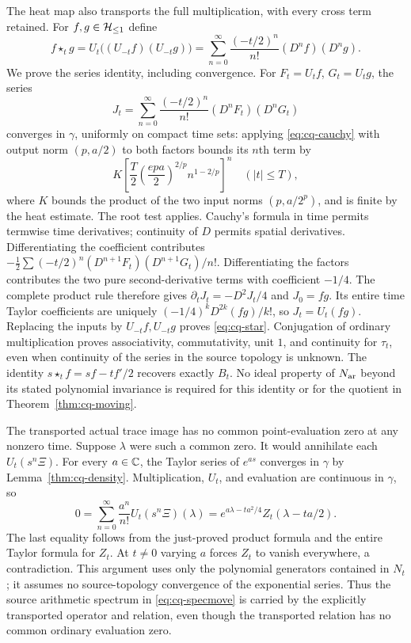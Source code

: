 The heat map also transports the full multiplication, with every
cross term retained. For $f,g\in\mathcal H_{\leq 1}$ define
\begin{equation}\label{eq:cq-star}
 f\star_t g=U_t\bigl((U_{-t}f)(U_{-t}g)\bigr)
    =\sum_{n=0}^\infty\frac{(-t/2)^n}{n!}(D^nf)(D^ng).
\end{equation}
We prove the series identity, including convergence. For
$F_t=U_tf$, $G_t=U_tg$, the series
\[
 J_t=\sum_{n=0}^\infty\frac{(-t/2)^n}{n!}
                    (D^nF_t)(D^nG_t)
\]
converges in $\gamma$, uniformly on compact time sets: applying
\eqref{eq:cq-cauchy} with output norm $(p,a/2)$ to both factors
bounds its $n$th term by
\[
 K\left[\frac T2\left(\frac{epa}{2}\right)^{2/p}
                   n^{1-2/p}\right]^n\quad(|t|\leq T),
\]
where $K$ bounds the product of the two input norms
$(p,a/2^p)$, and is finite by the heat estimate. The root test
applies. Cauchy's formula in time permits termwise time derivatives;
continuity of $D$ permits spatial derivatives. Differentiating the
coefficient contributes
$-\tfrac12\sum(-t/2)^n(D^{n+1}F_t)(D^{n+1}G_t)/n!$.
Differentiating the factors contributes the two pure second-derivative
terms with coefficient $-1/4$. The complete product rule therefore
gives $\partial_tJ_t=-D^2J_t/4$ and $J_0=fg$.
Its entire time Taylor coefficients are uniquely
$(-1/4)^kD^{2k}(fg)/k!$, so $J_t=U_t(fg)$.
Replacing the inputs by $U_{-t}f,U_{-t}g$ proves
\eqref{eq:cq-star}. Conjugation of ordinary multiplication proves
associativity, commutativity, unit $1$, and continuity for $\tau_t$,
even when continuity of the series in the source topology is unknown.
The identity $s\star_t f=sf-tf'/2$ recovers exactly $B_t$.
No ideal property of $N_{\rm ar}$ beyond its stated polynomial invariance
is required for this identity or for the quotient in
Theorem~\ref{thm:cq-moving}.

The transported actual trace image has no common point-evaluation
zero at any nonzero time. Suppose $\lambda$ were such a common
zero. It would annihilate each $U_t(s^n\Xi)$. For every $a\in\mathbb C$,
the Taylor series of $e^{as}$ converges in $\gamma$ by
Lemma~\ref{thm:cq-density}. Multiplication, $U_t$, and evaluation
are continuous in $\gamma$, so
\[
 0=\sum_{n=0}^\infty\frac{a^n}{n!}U_t(s^n\Xi)(\lambda)
   =e^{a\lambda-ta^2/4}Z_t(\lambda-ta/2).
\]
The last equality follows from the just-proved product formula
and the entire Taylor formula for $Z_t$. At $t\ne0$ varying $a$
forces $Z_t$ to vanish everywhere, a contradiction. This argument
uses only the polynomial generators contained in $N_t$; it assumes
no source-topology convergence of the exponential series. Thus the
source arithmetic spectrum in \eqref{eq:cq-specmove} is carried by
the explicitly transported operator and relation, even though the
transported relation has no common ordinary evaluation zero.

